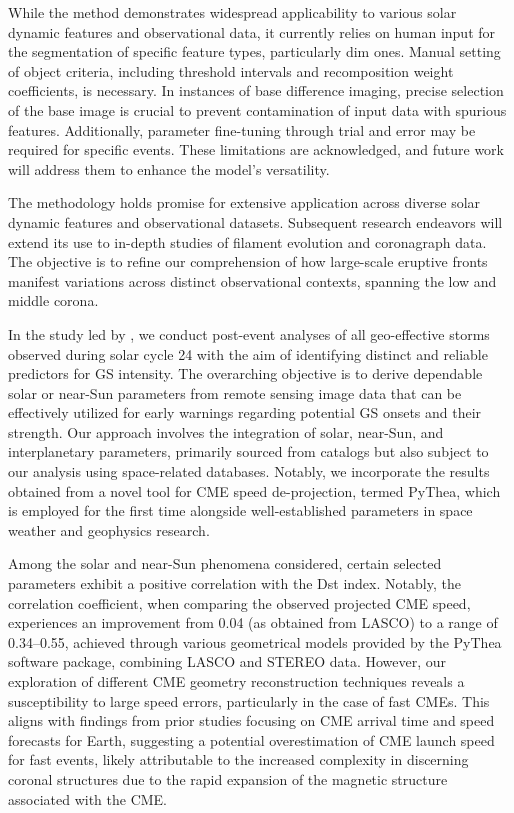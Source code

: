 While the method demonstrates widespread applicability to various solar dynamic features and observational data, it currently relies on human input for the segmentation of specific feature types, particularly dim ones. Manual setting of object criteria, including threshold intervals and recomposition weight coefficients, is necessary. In instances of base difference imaging, precise selection of the base image is crucial to prevent contamination of input data with spurious features. Additionally, parameter fine-tuning through trial and error may be required for specific events. These limitations are acknowledged, and future work will address them to enhance the model's versatility.

The methodology holds promise for extensive application across diverse solar dynamic features and observational datasets. Subsequent research endeavors will extend its use to in-depth studies of filament evolution and coronagraph data. The objective is to refine our comprehension of how large-scale eruptive fronts manifest variations across distinct observational contexts, spanning the low and middle corona.

In the study led by \citet{miteva_2023}, we conduct post-event analyses of all geo-effective storms observed during solar cycle 24 with the aim of identifying distinct and reliable predictors for GS intensity. The overarching objective is to derive dependable solar or near-Sun parameters from remote sensing image data that can be effectively utilized for early warnings regarding potential GS onsets and their strength. Our approach involves the integration of solar, near-Sun, and interplanetary parameters, primarily sourced from catalogs but also subject to our analysis using space-related databases. Notably, we incorporate the results obtained from a novel tool for CME speed de-projection, termed PyThea, which is employed for the first time alongside well-established parameters in space weather and geophysics research.

Among the solar and near-Sun phenomena considered, certain selected parameters exhibit a positive correlation with the Dst index. Notably, the correlation coefficient, when comparing the observed projected CME speed, experiences an improvement from 0.04 (as obtained from LASCO) to a range of 0.34–0.55, achieved through various geometrical models provided by the PyThea software package, combining LASCO and STEREO data. However, our exploration of different CME geometry reconstruction techniques reveals a susceptibility to large speed errors, particularly in the case of fast CMEs. This aligns with findings from prior studies focusing on CME arrival time and speed forecasts for Earth, suggesting a potential overestimation of CME launch speed for fast events, likely attributable to the increased complexity in discerning coronal structures due to the rapid expansion of the magnetic structure associated with the CME.

